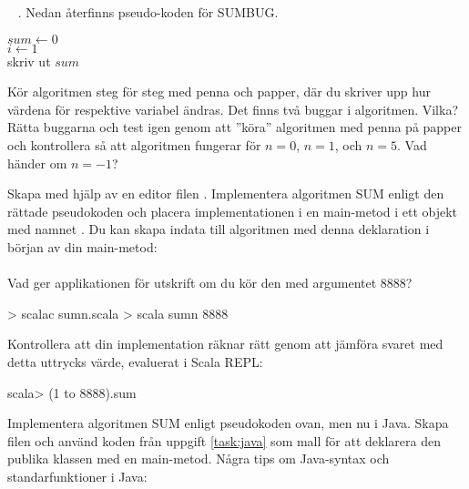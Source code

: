
\QUESTBEGIN

\Task  \what~ . Nedan återfinns pseudo-koden för SUMBUG.

\begin{algorithm}[H]

 $sum \leftarrow 0$ \\
 $i \leftarrow 1$  \\
 skriv ut $sum$
\end{algorithm}

\Subtask\Pen Kör algoritmen steg för steg med penna och papper, där du skriver upp hur värdena för respektive variabel ändras. Det finns två buggar i algoritmen. Vilka? Rätta buggarna och test igen genom att ''köra'' algoritmen med penna på papper och kontrollera så att algoritmen fungerar för $n=0$, $n=1$, och $n=5$. Vad händer om $n=-1$?

\Subtask Skapa med hjälp av en editor filen . Implementera algoritmen SUM enligt den rättade pseudokoden och placera implementationen i en main-metod i ett objekt med namnet . Du kan skapa indata  till algoritmen med denna deklaration i början av din main-metod: \\  \\ Vad ger applikationen för utskrift om du kör den med argumentet 8888?

\begin{REPLnonum}
> scalac sumn.scala
> scala sumn 8888
\end{REPLnonum}

\Subtask Kontrollera att din implementation räknar rätt genom att jämföra svaret med detta uttrycks värde, evaluerat i Scala REPL:
\begin{REPLnonum}
scala> (1 to 8888).sum
\end{REPLnonum}

\Subtask Implementera algoritmen SUM enligt pseudokoden ovan, men nu i Java. Skapa filen  och använd koden från uppgift \ref{task:java} som mall för att deklarera den publika klassen  med en main-metod. Några tips om Java-syntax och standarfunktioner i Java:

